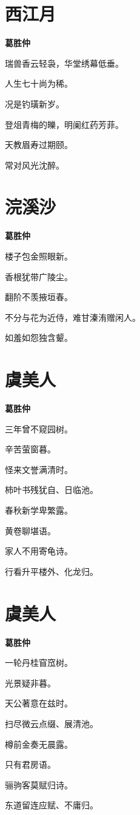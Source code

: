 \documentclass[12pt,a4paper]{ctexbook}
\begin{document}
\section{西江月}
\textbf{葛胜仲}\par\vspace{0.5em}
瑞兽香云轻袅，华堂绣幕低垂。\par
人生七十尚为稀。\par
况是钓璜新岁。\par
登俎青梅的皪，明阑红药芳菲。\par
天教眉寿过期颐。\par
常对风光沈醉。\par

\section{浣溪沙}
\textbf{葛胜仲}\par\vspace{0.5em}
楼子包金照眼新。\par
香根犹带广陵尘。\par
翻阶不羡掖垣春。\par
不分与花为近侍，难甘溱洧赠闲人。\par
如羞如怨独含颦。\par

\section{虞美人}
\textbf{葛胜仲}\par\vspace{0.5em}
三年曾不窥园树。\par
辛苦萤窗暮。\par
怪来文誉满清时。\par
柿叶书残犹自、日临池。\par
春秋新学卑繁露。\par
黄卷聊堪语。\par
家人不用寄龟诗。\par
行看升平楼外、化龙归。\par

\section{虞美人}
\textbf{葛胜仲}\par\vspace{0.5em}
一轮丹桂窅窊树。\par
光景疑非暮。\par
天公著意在兹时。\par
扫尽微云点缀、展清池。\par
樽前金奏无晨露。\par
只有君房语。\par
骊驹客莫赋归诗。\par
东道留连应赋、不庸归。\par
\end{document}
